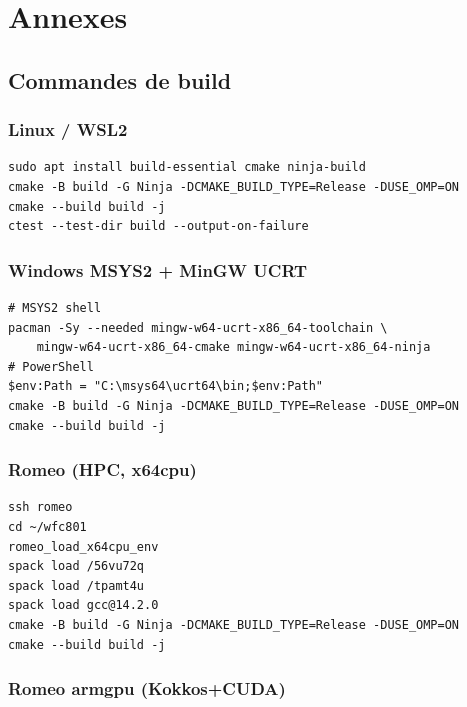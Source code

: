 \appendix

\chapter{Annexes}
\label{chap:annexes}

\section{Commandes de build}
\label{sec:annexes:build}

\subsection{Linux / WSL2}

\begin{verbatim}
sudo apt install build-essential cmake ninja-build
cmake -B build -G Ninja -DCMAKE_BUILD_TYPE=Release -DUSE_OMP=ON
cmake --build build -j
ctest --test-dir build --output-on-failure
\end{verbatim}

\subsection{Windows MSYS2 + MinGW UCRT}

\begin{verbatim}
# MSYS2 shell
pacman -Sy --needed mingw-w64-ucrt-x86_64-toolchain \
    mingw-w64-ucrt-x86_64-cmake mingw-w64-ucrt-x86_64-ninja
# PowerShell
$env:Path = "C:\msys64\ucrt64\bin;$env:Path"
cmake -B build -G Ninja -DCMAKE_BUILD_TYPE=Release -DUSE_OMP=ON
cmake --build build -j
\end{verbatim}

\subsection{Romeo (HPC, x64cpu)}

\begin{verbatim}
ssh romeo
cd ~/wfc801
romeo_load_x64cpu_env
spack load /56vu72q
spack load /tpamt4u
spack load gcc@14.2.0
cmake -B build -G Ninja -DCMAKE_BUILD_TYPE=Release -DUSE_OMP=ON
cmake --build build -j
\end{verbatim}

\subsection{Romeo armgpu (Kokkos+CUDA)}

